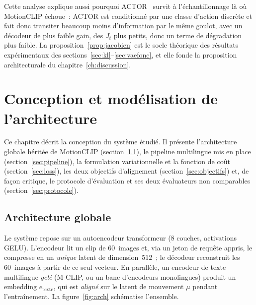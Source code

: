 \documentclass[12pt,a4paper,oneside]{report}
\theoremstyle{definition}
\theoremstyle{plain}
\begin{document}
Cette analyse explique aussi pourquoi ACTOR~\cite{petrovich2021actor} survit à
l'échantillonnage là où MotionCLIP échoue~: ACTOR est conditionné par une classe
d'action discrète et fait donc transiter beaucoup moins d'information par le même
goulot, avec un décodeur de plus faible gain, des $J_t$ plus petits, donc un
terme de dégradation plus faible. La proposition~\ref{prop:jacobien} est le socle
théorique des résultats expérimentaux des
sections~\ref{sec:kl}--\ref{sec:vaefonc}, et elle fonde la proposition
architecturale du chapitre~\ref{ch:discussion}.

\chapter{Conception et modélisation de l'architecture}
\label{ch:conception}

Ce chapitre décrit la conception du système étudié. Il présente l'architecture
globale héritée de MotionCLIP (section~\ref{sec:archi}), le pipeline multilingue
mis en place (section~\ref{sec:pipeline}), la formulation variationnelle et la
fonction de coût (section~\ref{sec:loss}), les deux objectifs d'alignement
(section~\ref{sec:objectifs}) et, de façon critique, le protocole d'évaluation et
ses deux évaluateurs non comparables (section~\ref{sec:protocole}).

\section{Architecture globale}
\label{sec:archi}

Le système repose sur un autoencodeur transformeur (8 couches, activations GELU).
L'encodeur lit un clip de 60~images et, via un jeton de requête appris, le
compresse en un \emph{unique} latent de dimension~512~; le décodeur reconstruit
les 60~images à partir de ce seul vecteur. En parallèle, un encodeur de texte
multilingue \emph{gelé} (M-CLIP, ou un banc d'encodeurs monolingues) produit un
embedding $e_{\text{texte}}$, qui est \emph{aligné} sur le latent de mouvement
$\mu$ pendant l'entraînement. La figure~\ref{fig:arch} schématise l'ensemble.
\end{document}
